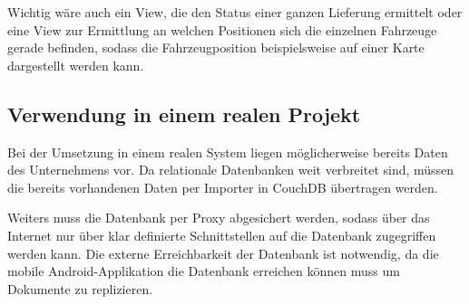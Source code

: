 Wichtig wäre auch ein View, die den Status einer ganzen Lieferung ermittelt oder
	eine View zur Ermittlung an welchen Positionen sich die einzelnen Fahrzeuge
	gerade befinden, sodass die Fahrzeugposition beispielsweise auf einer Karte
	dargestellt werden kann.

\subsection{Verwendung in einem realen Projekt}

Bei der Umsetzung in einem realen System liegen möglicherweise bereits Daten des
 	Unternehmens vor. Da relationale Datenbanken weit verbreitet sind, müssen die
	bereits vorhandenen Daten per Importer in CouchDB übertragen werden.

Weiters muss die Datenbank per Proxy abgesichert werden, sodass über das Internet
	nur über klar definierte Schnittstellen auf die Datenbank zugegriffen werden
	kann. Die externe Erreichbarkeit der Datenbank ist notwendig, da die mobile
	Android-Applikation die Datenbank erreichen können muss um Dokumente zu replizieren.
